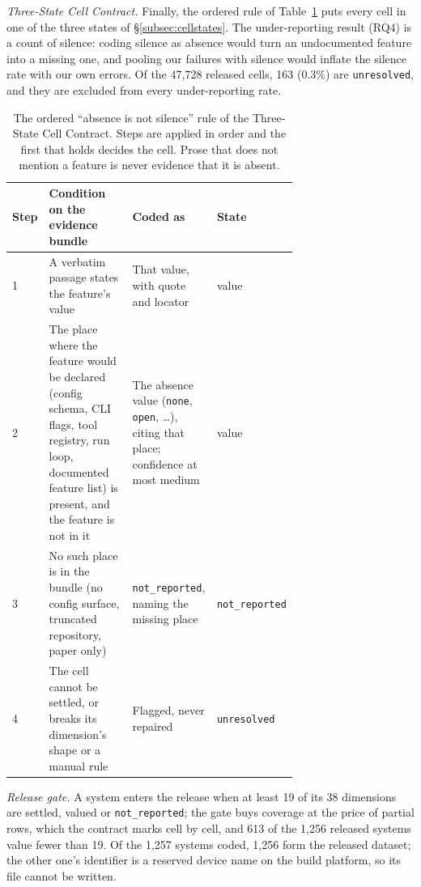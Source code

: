\emph{Three-State Cell Contract.} Finally, the ordered rule of Table~\ref{tab:absence-rule} puts every
cell in one of the three states of \S\ref{subsec:cellstates}. The under-reporting result (RQ4) is a count
of silence: coding silence as absence would turn an undocumented feature into a missing one, and pooling
our failures with silence would inflate the silence rate with our own errors. Of the 47,728 released
cells, 163 (0.3\%) are \texttt{unresolved}, and they are excluded from every under-reporting rate.

\begin{table}[t]
  \footnotesize
  \caption{The ordered ``absence is not silence'' rule of the Three-State Cell Contract. Steps are applied in
  order and the first that holds decides the cell. Prose that does not mention a feature is never evidence
  that it is absent.}
  \label{tab:absence-rule}
  \begin{tabular}{@{}l p{0.40\linewidth} p{0.30\linewidth} l@{}}
    \toprule
    Step & Condition on the evidence bundle & Coded as & State \\
    \midrule
    1 & A verbatim passage states the feature's value & That value, with quote and locator & value \\
    2 & The place where the feature would be declared (config schema, CLI flags, tool registry, run loop,
        documented feature list) is present, and the feature is not in it & The absence value
        (\texttt{none}, \texttt{open}, \ldots), citing that place; confidence at most medium & value \\
    3 & No such place is in the bundle (no config surface, truncated repository, paper only) &
        \texttt{not\_reported}, naming the missing place & \texttt{not\_reported} \\
    4 & The cell cannot be settled, or breaks its dimension's shape or a manual rule &
        Flagged, never repaired & \texttt{unresolved} \\
    \bottomrule
  \end{tabular}
\end{table}

\emph{Release gate.} A system enters the release when at least 19 of its 38 dimensions are settled,
valued or \texttt{not\_reported}; the gate buys coverage at the price of partial rows, which the
contract marks cell by cell, and 613 of the 1,256 released systems value fewer than 19. Of the 1,257
systems coded, 1,256 form the released dataset; the other one's identifier is a reserved device name on
the build platform, so its file cannot be written.

